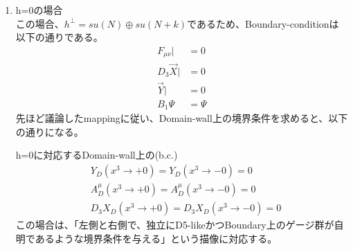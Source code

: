 \documentclass[dvipdfmx,a4paper,10.5pt]{article}
\numberwithin{equation}{section}
\begin{document}
\begin{enumerate}
    \item h=0の場合\\
    この場合、$h^{\perp}=su(N)\oplus su(N+k)$であるため、Boundary-conditionは以下の通りである。
    \begin{equation}
\begin{split}
    F_{\mu\nu}|&=0\\
    D_{3}\vec{X}|&=0\\
    \vec{Y}|&=0\\
    B_{1}\Psi&=\Psi
\end{split}
\end{equation}
先ほど議論したmappingに従い、Domain-wall上の境界条件を求めると、以下の通りになる。
\begin{resultbox}{h=0に対応するDomain-wall上の(b.c.)}
    \begin{align*}
    &Y_{D}(x^{3}\to +0)=Y_{D}(x^{3}\to -0)=0\\
    &A^{\mu}_{D}(x^{3}\to +0)=A^{\mu}_{D}(x^{3}\to -0)=0\\
    &D_{3}X_{D}(x^{3}\to +0)=D_{3}X_{D}(x^{3}\to -0)=0
\end{align*}
この場合は、「左側と右側で、独立にD5-likeかつBoundary上のゲージ群が自明であるような境界条件を与える」という描像に対応する。
\end{resultbox}


\end{enumerate}
\end{document}
